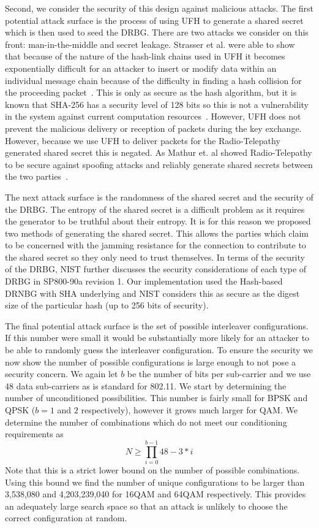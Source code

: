 \documentclass[sigconf, anonymous]{acmart}
\begin{document}
Second, we consider the security of this design against malicious attacks. The first potential attack surface is the process of using UFH to generate a shared secret which is then used to seed the DRBG. There are two attacks we consider on this front: man-in-the-middle and secret leakage. Strasser et al. were able to show that because of the nature of the hash-link chains used in UFH it becomes exponentially difficult for an attacker to insert or modify data within an individual message chain because of the difficulty in finding a hash collision for the proceeding packet~\cite{strasser2008jamming}. This is only as secure as the hash algorithm, but it is known that SHA-256 has a security level of 128 bits so this is not a vulnerability in the system against current computation resources~\cite{barker2016nist57}. However, UFH does not prevent the malicious delivery or reception of packets during the key exchange. However, because we use UFH to deliver packets for the Radio-Telepathy generated shared secret this is negated. As Mathur et. al showed Radio-Telepathy to be secure against spoofing attacks and reliably generate shared secrets between the two parties~\cite{mathur2008radio}.

The next attack surface is the randomness of the shared secret and the security of the DRBG. The entropy of the shared secret is a difficult problem as it requires the generator to be truthful about their entropy. It is for this reason we proposed two methods of generating the shared secret. This allows the parties which claim to be concerned with the jamming resistance for the connection to contribute to the shared secret so they only need to trust themselves. In terms of the security of the DRBG, NIST further discusses the security considerations of each type of DRBG in SP800-90a revision 1\cite{barker2015nist90a}. Our implementation used the Hash-based DRNBG with SHA underlying and NIST considers this as secure as the digest size of the particular hash (up to 256 bits of security). 

The final potential attack surface is the set of possible interleaver configurations. If this number were small it would be substantially more likely for an attacker to be able to randomly guess the interleaver configuration. To ensure the security we now show the number of possible configurations is large enough to not pose a security concern. We again let $b$ be the number of bits per sub-carrier and we use 48 data sub-carriers as is standard for 802.11. We start by determining the number of unconditioned possibilities. This number is fairly small for BPSK and QPSK ($b= 1$ and $2$ respectively), however it grows much larger for QAM. We determine the number of combinations which do not meet our conditioning requirements as 
$$N \geq \prod_{i=0}^{b-1} 48 - 3*i$$
Note that this is a strict lower bound on the number of possible combinations. Using this bound we find the number of unique configurations to be larger than 3,538,080 and 4,203,239,040 for 16QAM and 64QAM respectively.  This provides an adequately large search space so that an attack is unlikely to choose the correct configuration at random.
\end{document}
